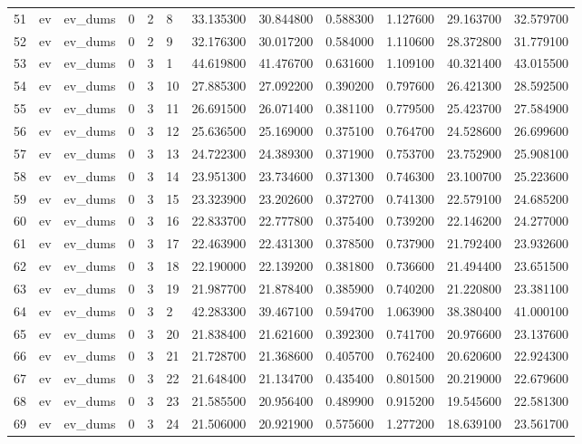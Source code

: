 \begin{tabular}{llllllrrrrrr}
51 & ev & ev_dums & 0 & 2 & 8 & 33.135300 & 30.844800 & 0.588300 & 1.127600 & 29.163700 & 32.579700 \\
52 & ev & ev_dums & 0 & 2 & 9 & 32.176300 & 30.017200 & 0.584000 & 1.110600 & 28.372800 & 31.779100 \\
53 & ev & ev_dums & 0 & 3 & 1 & 44.619800 & 41.476700 & 0.631600 & 1.109100 & 40.321400 & 43.015500 \\
54 & ev & ev_dums & 0 & 3 & 10 & 27.885300 & 27.092200 & 0.390200 & 0.797600 & 26.421300 & 28.592500 \\
55 & ev & ev_dums & 0 & 3 & 11 & 26.691500 & 26.071400 & 0.381100 & 0.779500 & 25.423700 & 27.584900 \\
56 & ev & ev_dums & 0 & 3 & 12 & 25.636500 & 25.169000 & 0.375100 & 0.764700 & 24.528600 & 26.699600 \\
57 & ev & ev_dums & 0 & 3 & 13 & 24.722300 & 24.389300 & 0.371900 & 0.753700 & 23.752900 & 25.908100 \\
58 & ev & ev_dums & 0 & 3 & 14 & 23.951300 & 23.734600 & 0.371300 & 0.746300 & 23.100700 & 25.223600 \\
59 & ev & ev_dums & 0 & 3 & 15 & 23.323900 & 23.202600 & 0.372700 & 0.741300 & 22.579100 & 24.685200 \\
60 & ev & ev_dums & 0 & 3 & 16 & 22.833700 & 22.777800 & 0.375400 & 0.739200 & 22.146200 & 24.277000 \\
61 & ev & ev_dums & 0 & 3 & 17 & 22.463900 & 22.431300 & 0.378500 & 0.737900 & 21.792400 & 23.932600 \\
62 & ev & ev_dums & 0 & 3 & 18 & 22.190000 & 22.139200 & 0.381800 & 0.736600 & 21.494400 & 23.651500 \\
63 & ev & ev_dums & 0 & 3 & 19 & 21.987700 & 21.878400 & 0.385900 & 0.740200 & 21.220800 & 23.381100 \\
64 & ev & ev_dums & 0 & 3 & 2 & 42.283300 & 39.467100 & 0.594700 & 1.063900 & 38.380400 & 41.000100 \\
65 & ev & ev_dums & 0 & 3 & 20 & 21.838400 & 21.621600 & 0.392300 & 0.741700 & 20.976600 & 23.137600 \\
66 & ev & ev_dums & 0 & 3 & 21 & 21.728700 & 21.368600 & 0.405700 & 0.762400 & 20.620600 & 22.924300 \\
67 & ev & ev_dums & 0 & 3 & 22 & 21.648400 & 21.134700 & 0.435400 & 0.801500 & 20.219000 & 22.679600 \\
68 & ev & ev_dums & 0 & 3 & 23 & 21.585500 & 20.956400 & 0.489900 & 0.915200 & 19.545600 & 22.581300 \\
69 & ev & ev_dums & 0 & 3 & 24 & 21.506000 & 20.921900 & 0.575600 & 1.277200 & 18.639100 & 23.561700 \\

\end{tabular}
